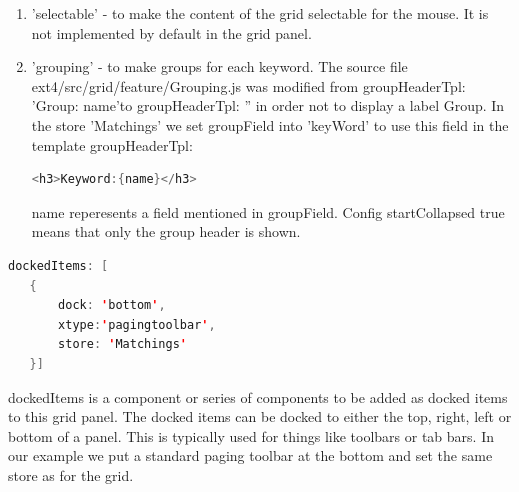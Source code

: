 \begin{enumerate}
	\item 'selectable' - to make the content of the grid selectable for the mouse. It is not implemented by default in the grid panel.
	\item 'grouping' - to make groups for each keyword. The source file ext4/src/grid/feature/Grouping.js was modified from  groupHeaderTpl: 
'Group: {name}'to groupHeaderTpl: '' in order not to display a label Group. In the store 'Matchings' we set  groupField into 'keyWord' to use this field in the template  groupHeaderTpl: 
\begin{lstlisting}[language=Java]
<h3>Keyword:{name}</h3>
\end{lstlisting}
{name} reperesents a field mentioned in groupField. Config startCollapsed true means that only the group header is shown.  
\end{enumerate}
   \begin{lstlisting}[language=Java]
   dockedItems: [
   {
       dock: 'bottom',
       xtype:'pagingtoolbar',
       store: 'Matchings' 
   }] 
	\end{lstlisting}
\par dockedItems is a component or series of components to be added as docked items to this grid panel. The docked items can be docked to either the top, right, left or bottom of a panel. This is typically used for things like toolbars or tab bars. In our example we put a standard paging toolbar at the bottom and set the same store as for the grid. \\ 
